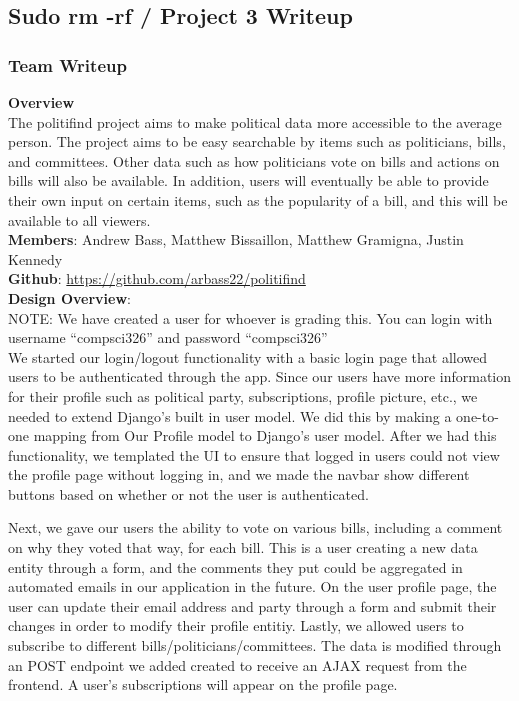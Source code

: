 \documentclass{article}
\newcommand{\n}{\noindent}
\begin{document}
\begin{center}
\subsection*{Sudo rm -rf / Project 3 Writeup}
\end{center}

\subsubsection*{Team Writeup}

\textbf{Overview} \\

The politifind project aims to make political data more accessible to the average person. The project aims to be easy searchable by items such as politicians, bills, and committees. Other data such as how politicians vote on bills and actions on bills will also be available. In addition, users will eventually be able to provide their own input on certain items, such as the popularity of a bill, and this will be available to all viewers. \\

\n\textbf{Members}: Andrew Bass, Matthew Bissaillon, Matthew Gramigna, Justin Kennedy \\

\n\textbf{Github}: \url{https://github.com/arbass22/politifind} \\

\n\textbf{Design Overview}: \\

\n NOTE: We have created a user for whoever is grading this. You can login with username ``compsci326'' and password ``compsci326'' \\

We started our login/logout functionality with a basic login page that allowed users to be authenticated through the app. Since our users have more information for their profile such as political party, subscriptions, profile picture, etc., we needed to extend Django's built in user model. We did this by making a one-to-one mapping from Our Profile model to Django's user model. After we had this functionality, we templated the UI to ensure that logged in users could not view the profile page without logging in, and we made the navbar show different buttons based on whether or not the user is authenticated.

Next, we gave our users the ability to vote on various bills, including a comment on why they voted that way, for each bill. This is a user creating a new data entity through a form, and the comments they put could be aggregated in automated emails in our application in the future.  On the user profile page, the user can update their email address and party through a form and submit their changes in order to modify their profile entitiy.  Lastly, we allowed users to subscribe to different bills/politicians/committees. The data is modified through an POST endpoint we added created to receive an AJAX request from the frontend.   A user's subscriptions will appear on the profile page.\\
\end{document}
